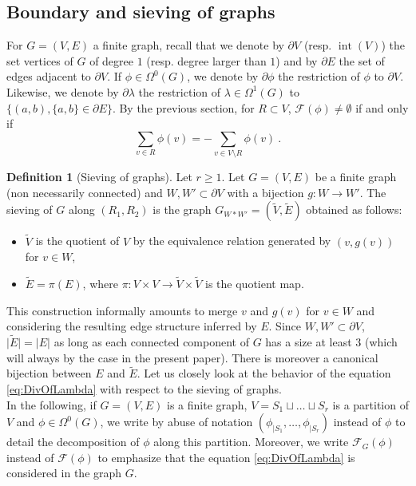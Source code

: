 \documentclass[11pt,a4paper]{amsart}
\DeclareMathOperator{\interior}{int}
\numberwithin{equation}{section}
\theoremstyle{definition}
\newtheorem{definition}[theorem]{Definition}
\begin{document}
\subsection{Boundary and sieving of graphs}
\label{subsec:sieving_contraction}

For $G=(V,E)$ a finite graph, recall that we denote by $\partial V$ (resp. $\interior(V)$) 
the set vertices of $G$ of degree $1$ (resp. degree larger than $1$) and by 
$\partial E$ the set of edges adjacent to $\partial V$. If $\phi\in \Omega ^0(G)$, 
we denote by $\partial \phi$ the restriction of $\phi$ to $\partial V$. 
Likewise, we denote by $\partial \lambda$ the restriction of $\lambda\in \Omega^1(G)$ 
to $\{(a,b),\{a,b\}\in\partial E\}$. By the previous section, 
for $R\subset  V$, $\mathcal{F}(\phi) \neq \emptyset$ if and only if 
$$\sum_{v\in R}\phi(v)=-\sum_{v\in V\setminus R}\phi(v) \ .$$


\begin{definition}[Sieving of graphs]\label{def:sieving}
Let $r\geqslant 1$. Let $G=(V,E)$ be a finite graph 
(non necessarily connected) and $W,W'\subset \partial V$ 
with a bijection $g:W\rightarrow W'$. 
The sieving of $G$ along $(R_1,R_2)$ is the graph 
$G_{W*W'}=(\tilde{V},\tilde{E})$ obtained as follows:
\begin{itemize}
\item $\tilde{V}$ is the quotient of $V$ by the equivalence relation generated by $(v,g(v))$ for $v\in W$,
\item $\tilde{E}=\pi(E)$, where $\pi:V\times V\rightarrow \tilde{V}\times \tilde{V}$ is the quotient map.
\end{itemize}
\end{definition}

\noindent
This construction informally amounts to merge $v$ and $g(v)$ for 
$v\in W$ and considering the resulting edge structure inferred by $E$. 
Since $W,W'\subset \partial V$, $\vert \tilde{E}\vert=\vert E\vert$ as long 
as each connected component of $G$ has a size at least $3$ 
(which will always by the case in the present paper). 
There is moreover a canonical bijection between $E$ and $\tilde{E}$. 
Let us closely look at the behavior of the equation \eqref{eq:DivOfLambda} 
with respect to the sieving of graphs. 
\\
In the following, if $G=(V,E)$ is a finite graph, $V=S_1\sqcup\ldots \sqcup S_r$ 
is a partition of $V$ and $\phi\in \Omega^0(G)$, we write by abuse of notation 
$(\phi_{\vert S_1},\ldots,\phi_{\vert S_r})$ instead of $\phi$ to detail the 
decomposition of $\phi$ along this partition. Moreover, we write $\mathcal{F}_{G}(\phi)$ 
instead of $\mathcal{F}(\phi)$ to emphasize that the equation \eqref{eq:DivOfLambda} 
is considered in the graph $G$.
\end{document}
